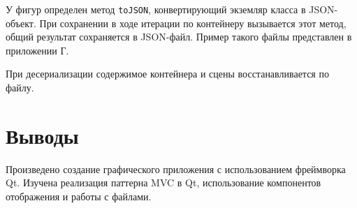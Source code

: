 \documentclass[a4paper, 14pt]{extarticle}
\newcommand{\insertCPP}[1]{%
    {\fontsize{12pt}{1.5pt}\selectfont
    
    }
}
\begin{document}
У фигур определен метод \texttt{toJSON}, конвертирующий экземляр класса в JSON-объект. При сохранении в ходе итерации по контейнеру вызывается этот метод, общий результат сохраняется в JSON-файл. Пример такого файлы представлен в приложении Г.

При десериализации содержимое контейнера и сцены восстанавливается по файлу.

\section{Выводы}
Произведено создание графического приложения с использованием фреймворка Qt. Изучена реализация паттерна MVC в Qt, использование компонентов отображения и работы с файлами.

\begin{underlineURL}
    \printbibliography{}
\end{underlineURL}

\insertCPP{../src/point.h}
\insertCPP{../src/point.cpp}
\insertCPP{../src/figures/shape.h}
\insertCPP{../src/figures/shape.cpp}
\insertCPP{../src/figures/atansegment.h}
\insertCPP{../src/figures/atansegment.cpp}
\insertCPP{../src/figures/pentagram.h}
\insertCPP{../src/figures/pentagram.cpp}
\insertCPP{../src/figures/text.h}
\insertCPP{../src/figures/text.cpp}
\insertCPP{../src/figures/pentagramtext.h}
\insertCPP{../src/figures/pentagramtext.cpp}

\insertCPP{../src/hashMap.h}
\insertCPP{../src/exception.h}

\insertCPP{../src/main.cpp}
\insertCPP{../src/mainwindow.h}
\insertCPP{../src/mainwindow.cpp}
\insertCPP{../src/adddialog.h}
\insertCPP{../src/adddialog.cpp}

\insertCPP{./example.json}
\end{document}
